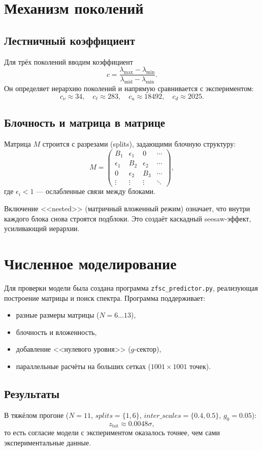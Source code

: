 \documentclass[12pt,a4paper]{article}
\begin{document}
\section{Механизм поколений}
\subsection{Лестничный коэффициент}
Для трёх поколений вводим коэффициент
\[
c = \frac{\lambda_{\max} - \lambda_{\min}}{\lambda_{\text{mid}} - \lambda_{\min}}.
\]
Он определяет иерархию поколений и напрямую сравнивается с экспериментом:
\[
c_\nu \approx 34, \quad c_\ell \approx 283, \quad c_u \approx 18492, \quad c_d \approx 2025.
\]

\subsection{Блочность и матрица в матрице}
Матрица $M$ строится с разрезами (splits), задающими блочную структуру:
\[
M = \begin{pmatrix}
B_1 & \epsilon_1 & 0 & \cdots \\
\epsilon_1 & B_2 & \epsilon_2 & \cdots \\
0 & \epsilon_2 & B_3 & \cdots \\
\vdots & \vdots & \vdots & \ddots
\end{pmatrix},
\]
где $\epsilon_i < 1$ --- ослабленные связи между блоками.

Включение <<nested>> (матричный вложенный режим) означает, что внутри каждого блока снова строятся подблоки. Это создаёт каскадный seesaw-эффект, усиливающий иерархии.

\section{Численное моделирование}
Для проверки модели была создана программа \texttt{zfsc\_predictor.py}, реализующая построение матрицы и поиск спектра. Программа поддерживает:
\begin{itemize}
  \item разные размеры матрицы ($N=6 \ldots 13$),
  \item блочность и вложенность,
  \item добавление <<нулевого уровня>> ($g$-сектор),
  \item параллельные расчёты на больших сетках ($1001\times1001$ точек).
\end{itemize}



\subsection{Результаты}
В тяжёлом прогоне ($N=11$, $splits=\{1,6\}$, $inter\_scales=\{0.4,0.5\}$, $g_0=0.05$):
\[
z_{\text{tot}} \approx 0.0048\sigma,
\]
то есть согласие модели с экспериментом оказалось точнее, чем сами экспериментальные данные.
\end{document}
